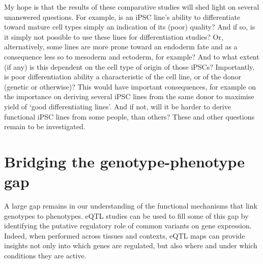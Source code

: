 My hope is that the results of these comparative studies will shed light on several unanswered questions.
For example, is an iPSC line's ability to differentiate toward mature cell types simply an indication of its (poor) quality?
And if so, is it simply not possible to use these lines for differentiation studies?
Or, alternatively, some lines are more prone toward an endoderm fate and as a consequence less so to mesoderm and ectoderm, for example?
And to what extent (if any) is this dependent on the cell type of origin of those iPSCs?
Importantly, is poor differentiation ability a characteristic of the cell line, or of the donor (genetic or otherwise)?
This would have important consequences, for example on the importance on deriving several iPSC lines from the same donor to maximise yield of `good differentiating lines'.
And if not, will it be harder to derive functional iPSC lines from some people, than others?
These and other questions remain to be investigated.


\section{Bridging the genotype-phenotype gap}
\label{sec:discussion_part2}

A large gap remains in our understanding of the functional mechanisms that link genotypes to phenotypes.
eQTL studies can be used to fill some of this gap by 
identifying the putative regulatory role of common variants on gene expression.
Indeed, when performed across tissues and contexts, eQTL maps can provide insights not only into which genes are regulated, but also where and under which conditions they are active.\\

